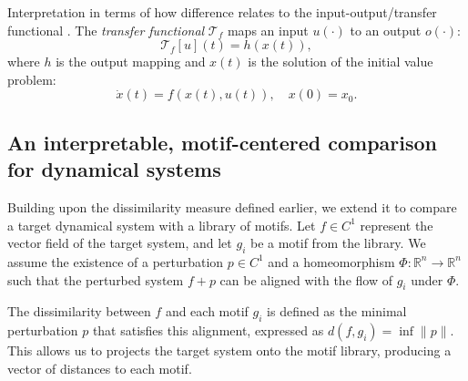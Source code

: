 \documentclass{article}
\newcommand{\ascomment}[1]{\textcolor{ascolor}{(#1)}}
\theoremstyle{definition} \newtheorem{definition}{Definition}  \newtheorem{example}{Example}
\theoremstyle{remark} \newtheorem{remark}{Remark}
\newcounter{ct}
\newcommand{\field}[1]{\ensuremath{\mathbb{#1}}}
\newcommand{\reals}{\field{R}}
\begin{document}
Interpretation in terms of how difference relates to the input-output/transfer functional \citep{zhang2025neural,dinc2025latentcomputing}.
The \emph{transfer functional} \( \mathcal{T}_f \) maps an input \( u(\cdot) \) to an output \( o(\cdot) \): %
\[
\mathcal{T}_f[u](t) = h(x(t)),
\]
where \(h\) is the output mapping and \( x(t) \) is the solution of the initial value problem:
\[
\dot{x}(t) = f(x(t), u(t)), \quad x(0) = x_0.
\]
%






\subsection{An interpretable, motif-centered comparison for dynamical systems}\label{sec:aut_motif_metric}
Building upon the dissimilarity measure defined earlier, we extend it to compare a target dynamical system with a library of motifs. Let \( f \in C^1 \) represent the vector field of the target system, and let \( g_i \) be a motif from the library. We assume the existence of a perturbation \( p \in C^1 \) and a homeomorphism \( \Phi: \mathbb{R}^n \rightarrow \mathbb{R}^n \) such that the perturbed system \( f + p \) can be aligned with the flow of \( g_i \) under \( \Phi \). 

The dissimilarity between \( f \) and each motif \( g_i \) is defined as the minimal perturbation \( p \) that satisfies this alignment, expressed as \( d(f, g_i) = \inf \|p\| \).
This allows us to projects the target system onto the motif library, producing a vector of distances to each motif.
\end{document}
